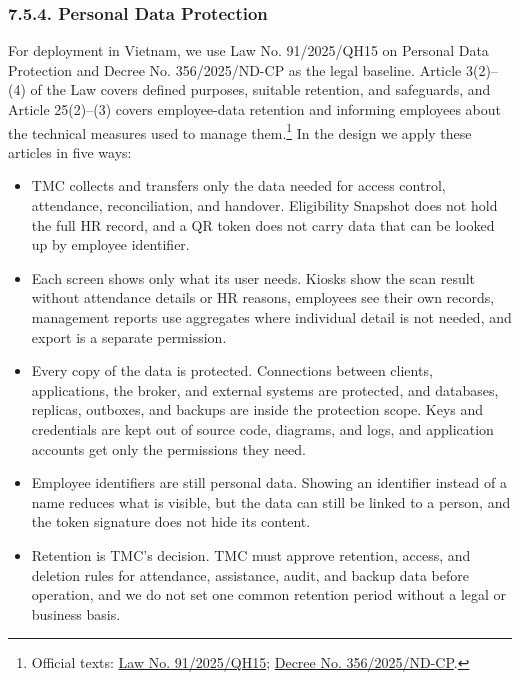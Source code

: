 \subsubsection*{7.5.4. Personal Data Protection}

{}

For deployment in Vietnam, we use Law No. 91/2025/QH15 on Personal Data Protection and Decree No. 356/2025/ND-CP as the legal baseline. Article 3(2)--(4) of the Law covers defined purposes, suitable retention, and safeguards, and Article 25(2)--(3) covers employee-data retention and informing employees about the technical measures used to manage them.\footnote{Official texts: \href{https://congbaocdn.chinhphu.vn/CongBaoCP/CongBao/2025/7/45574/57723-1-971-972.pdf}{Law No. 91/2025/QH15}; \href{https://vanban.chinhphu.vn/?classid=1\&docid=216387\&pageid=27160}{Decree No. 356/2025/ND-CP}.} In the design we apply these articles in five ways:

\begin{itemize}[leftmargin=36pt, itemsep=2pt, topsep=4pt, parsep=2pt]
  \item TMC collects and transfers only the data needed for access control, attendance, reconciliation, and handover. Eligibility Snapshot does not hold the full HR record, and a QR token does not carry data that can be looked up by employee identifier.
  \item Each screen shows only what its user needs. Kiosks show the scan result without attendance details or HR reasons, employees see their own records, management reports use aggregates where individual detail is not needed, and export is a separate permission.
  \item Every copy of the data is protected. Connections between clients, applications, the broker, and external systems are protected, and databases, replicas, outboxes, and backups are inside the protection scope. Keys and credentials are kept out of source code, diagrams, and logs, and application accounts get only the permissions they need.
  \item Employee identifiers are still personal data. Showing an identifier instead of a name reduces what is visible, but the data can still be linked to a person, and the token signature does not hide its content.
  \item Retention is TMC's decision. TMC must approve retention, access, and deletion rules for attendance, assistance, audit, and backup data before operation, and we do not set one common retention period without a legal or business basis.
\end{itemize}

